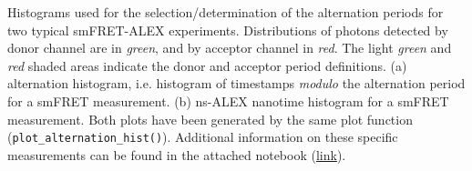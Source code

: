 \label{fig:altern_hist_double} Histograms used for the selection/determination 
of the alternation periods for two typical smFRET-ALEX experiments.
Distributions of photons detected by donor channel are in \textit{green}, and by acceptor channel in \textit{red}.
The light \textit{green} and \textit{red} shaded areas indicate the donor and acceptor period definitions.
(a) \usalex alternation histogram, i.e. histogram of timestamps \textit{modulo} the alternation period for a smFRET measurement. 
(b) ns-ALEX nanotime histogram for a smFRET measurement. 
Both plots have been generated by the same plot function (\texttt{plot\_alternation\_hist()}). 
Additional information on these specific measurements can be found in the attached notebook 
(\href{http://nbviewer.jupyter.org/github/tritemio/fretbursts_paper/blob/master/notebooks/Figures%20-%20ALEX%20histograms.ipynb}{link}).